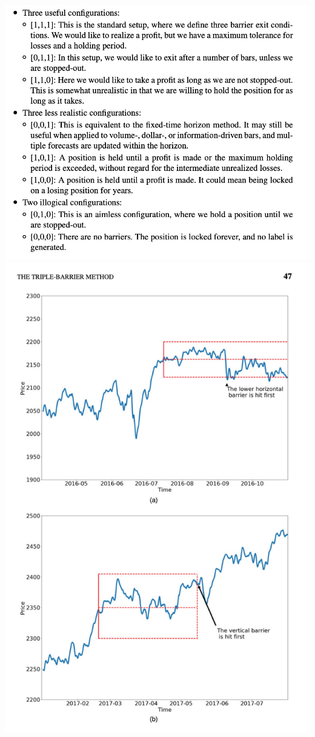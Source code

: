 \documentclass{article}
\begin{document}
\includegraphics[width=\textwidth]{TripleBarrierMethod.png}\\ 
\includegraphics[width=\textwidth]{TriplePicture.png}\\
\end{document}

